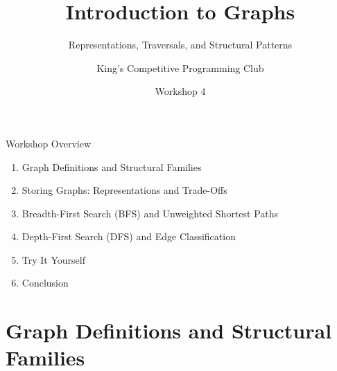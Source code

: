 \documentclass{beamer}
\title{Introduction to Graphs}
\subtitle{Representations, Traversals, and Structural Patterns}
\author{King's Competitive Programming Club}
\date{Workshop 4}
\begin{document}
\begin{frame}[plain]\titlepage\end{frame}

\begin{frame}{Workshop Overview}
  \begin{enumerate}
    \item Graph Definitions and Structural Families
    \item Storing Graphs: Representations and Trade-Offs
    \item Breadth-First Search (BFS) and Unweighted Shortest Paths
    \item Depth-First Search (DFS) and Edge Classification
    \item Try It Yourself
    \item Conclusion
  \end{enumerate}
\end{frame}

\section{Graph Definitions and Structural Families}
\end{document}
